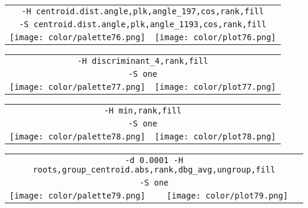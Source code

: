 \documentclass{article}
\begin{document}
\begin{center}
\begin{tabular}{m{8cm}m{8cm}}
\multicolumn{2}{c}{\tt -H centroid.dist.angle,plk,angle\_197,cos,rank,fill} \\
\multicolumn{2}{c}{\tt -S centroid.dist.angle,plk,angle\_1193,cos,rank,fill} \\
\texttt{[image: color/palette76.png]} &
\texttt{[image: color/plot76.png]}
\end{tabular}
\end{center}

\begin{center}
\begin{tabular}{m{8cm}m{8cm}}
\multicolumn{2}{c}{\tt -H discriminant\_4,rank,fill} \\
\multicolumn{2}{c}{\tt -S one} \\
\texttt{[image: color/palette77.png]} &
\texttt{[image: color/plot77.png]}
\end{tabular}
\end{center}

\begin{center}
\begin{tabular}{m{8cm}m{8cm}}
\multicolumn{2}{c}{\tt -H min,rank,fill} \\
\multicolumn{2}{c}{\tt -S one} \\
\texttt{[image: color/palette78.png]} &
\texttt{[image: color/plot78.png]}
\end{tabular}
\end{center}

\begin{center}
\begin{tabular}{m{8cm}m{8cm}}
\multicolumn{2}{c}{\tt -d 0.0001 -H roots,group\_centroid.abs,rank,dbg\_avg,ungroup,fill} \\
\multicolumn{2}{c}{\tt -S one} \\
\texttt{[image: color/palette79.png]} &
\texttt{[image: color/plot79.png]}
\end{tabular}
\end{center}
\end{document}
